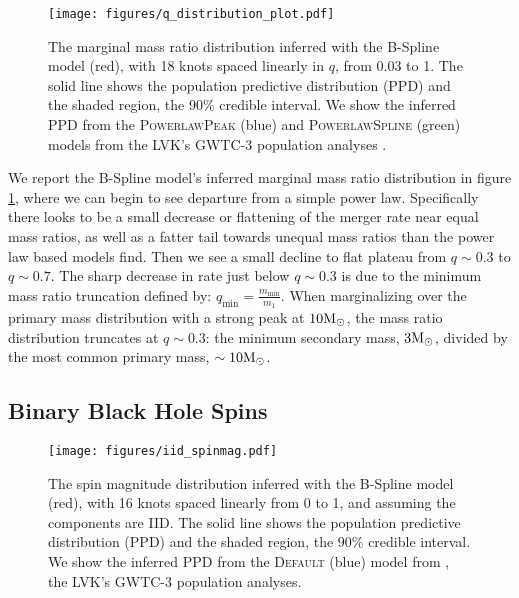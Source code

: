 \begin{figure}[h]
    \texttt{[image: figures/q\_distribution\_plot.pdf]}
    \caption{The marginal mass ratio distribution inferred with the B-Spline model (red), with 18 knots spaced linearly in $q$, from 0.03 to 1. 
    The solid line shows the population predictive distribution (PPD) and the shaded region, the 90\% credible interval. 
    We show the inferred PPD from the \textsc{PowerlawPeak} (blue) and \textsc{PowerlawSpline} (green) models from the LVK's 
    GWTC-3 population analyses \citep{o3b_astro_dist}.}
    \label{fig:q_distribution}
\end{figure}

We report the B-Spline model's inferred marginal mass ratio distribution in figure \ref{fig:q_distribution}, where we can begin to see departure from a simple 
power law. Specifically there looks to be a small decrease or flattening of the merger rate near equal mass ratios, as well as a fatter tail towards unequal mass ratios 
than the power law based models find. Then we see a small decline to flat plateau from $q\sim0.3$ to $q\sim0.7$. The sharp decrease in rate just below 
$q\sim0.3$ is due to the minimum mass ratio truncation defined by: $q_\mathrm{min}=\frac{m_\mathrm{min}}{m_1}$. When marginalizing over the primary mass 
distribution with a strong peak at $10{\rm M}_\odot$, the mass ratio distribution truncates at $q\sim0.3$: the minimum secondary mass, $3{\rm M}_\odot$, 
divided by the most common primary mass, $\sim10{\rm M}_\odot$. 


\subsection{Binary Black Hole Spins} \label{sec:spin_dist}

\begin{figure}
    \begin{centering}    
        \texttt{[image: figures/iid\_spinmag.pdf]}
        \caption{The spin magnitude distribution inferred with the B-Spline model (red), with 16 knots spaced linearly from 0 to 1, and 
        assuming the components are IID. The solid line shows the population predictive distribution (PPD) and the shaded region, the 90\% credible interval. 
        We show the inferred PPD from the \textsc{Default} (blue) model from \citet{o3b_astro_dist}, the LVK's GWTC-3 population analyses.}
        \label{fig:iid_spinmag_dist}
    \end{centering}
\end{figure}

